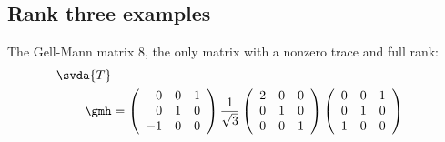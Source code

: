 \subsection{Rank three examples}
The Gell-Mann matrix 8, the only matrix with a nonzero trace and full rank:
\begin{equation}
  \begin{split}
    \svda{T}\\
    \gmh&=\left(
\begin{array}{rrr}
 0 & 0 & 1 \\
 0 & 1 & 0 \\
 -1 & 0 & 0
\end{array}
\right)
\frac{1}{\sqrt{3}}\left(
\begin{array}{ccc}
 2 & 0 & 0 \\
 0 & 1 & 0 \\
 0 & 0 & 1
\end{array}
\right)\left(
\begin{array}{ccc}
 0 & 0 & 1 \\
 0 & 1 & 0 \\
 1 & 0 & 0
\end{array}
\right)
  \end{split}
\end{equation}


